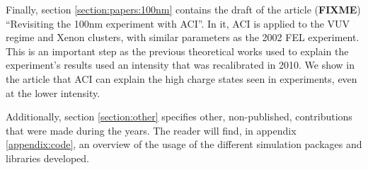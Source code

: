 Finally, section \ref{section:papers:100nm} contains the draft of the article
(\textbf{FIXME}) ``Revisiting the 100nm experiment with ACI''. In it, ACI is
applied to the VUV regime and Xenon clusters, with similar parameters as the 2002
FEL experiment. This is an important step as the previous theoretical works
used to explain the experiment's results used an intensity that was
recalibrated in 2010. We show in the article that ACI can explain the high
charge states seen in experiments, even at the lower intensity.

Additionally, section \ref{section:other} specifies other, non-published,
contributions that were made during the years. The reader will find, in appendix
\ref{appendix:code}, an overview of the usage of the different simulation
packages and libraries developed.





